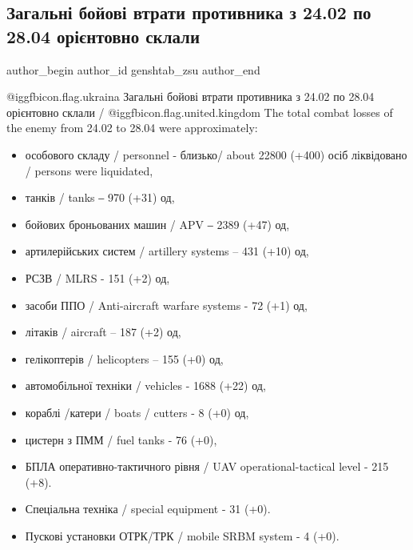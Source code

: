  
 
 
 
 
 
\subsection{Загальні бойові втрати противника з 24.02 по 28.04 орієнтовно склали}
\label{sec:28_04_2022.fb.genshtab_zsu.1.vtraty}
 
\ifcmt
 author_begin
   author_id genshtab_zsu
 author_end
\fi

@igg{fbicon.flag.ukraina}  Загальні бойові втрати противника з 24.02 по 28.04
орієнтовно склали / @igg{fbicon.flag.united.kingdom} The total combat losses of the enemy from 24.02 to
28.04 were approximately:


\begin{itemize}
  \item особового складу / personnel - близько/ about 22800 (+400) осіб ліквідовано / persons were liquidated, 
  \item танків / tanks ‒ 970 (+31) од, 
  \item бойових броньованих машин / APV  ‒ 2389 (+47) од, 
  \item артилерійських систем / artillery systems – 431 (+10) од, 
  \item РСЗВ / MLRS - 151 (+2) од, 
  \item засоби ППО / Anti-aircraft warfare systems - 72 (+1) од,
  \item літаків / aircraft – 187 (+2) од, 
  \item гелікоптерів / helicopters – 155 (+0) од, 
  \item автомобільної техніки / vehicles - 1688 (+22) од,
  \item кораблі /катери / boats / cutters - 8 (+0) од,
  \item цистерн з ПММ / fuel tanks - 76 (+0), 
  \item БПЛА оперативно-тактичного рівня / UAV operational-tactical level - 215 (+8).
  \item Спеціальна техніка / special equipment - 31 (+0).
  \item Пускові установки ОТРК/ТРК / mobile SRBM system - 4 (+0).
\end{itemize}


